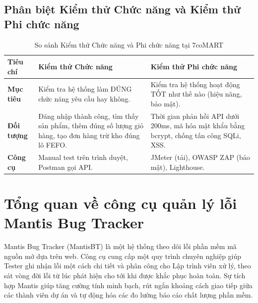 \subsection{Phân biệt Kiểm thử Chức năng và Kiểm thử Phi chức năng}
\begin{table}[H]
\centering
\caption{So sánh Kiểm thử Chức năng và Phi chức năng tại 7coMART}
\renewcommand{\arraystretch}{1.3}
\begin{tabular}{|p{2.2cm}|p{6cm}|p{6cm}|}
\hline
\textbf{Tiêu chí} & \textbf{Kiểm thử Chức năng} & \textbf{Kiểm thử Phi chức năng} \\ \hline
\textbf{Mục tiêu} & Kiểm tra hệ thống làm ĐÚNG chức năng yêu cầu hay không. & Kiểm tra hệ thống hoạt động TỐT như thế nào (hiệu năng, bảo mật). \\ \hline
\textbf{Đối tượng} & Đăng nhập thành công, tìm thấy sản phẩm, thêm đúng số lượng giỏ hàng, tạo đơn hàng trừ kho đúng lô FEFO. & Thời gian phản hồi API dưới 200ms, mã hóa mật khẩu bằng bcrypt, chống tấn công SQLi, XSS. \\ \hline
\textbf{Công cụ} & Manual test trên trình duyệt, Postman gọi API. & JMeter (tải), OWASP ZAP (bảo mật), Lighthouse. \\ \hline
\end{tabular}
\end{table}

\section{Tổng quan về công cụ quản lý lỗi Mantis Bug Tracker}
Mantis Bug Tracker (MantisBT) là một hệ thống theo dõi lỗi phần mềm mã nguồn mở dựa trên web. Công cụ cung cấp một quy trình chuyên nghiệp giúp Tester ghi nhận lỗi một cách chi tiết và phân công cho Lập trình viên xử lý, theo sát vòng đời lỗi từ lúc phát hiện cho tới khi được khắc phục hoàn toàn. Sự tích hợp Mantis giúp tăng cường tính minh bạch, rút ngắn khoảng cách giao tiếp giữa các thành viên dự án và tự động hóa các đo lường báo cáo chất lượng phần mềm.